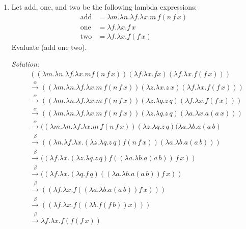 \documentclass[]{article}
\begin{document}
\begin{enumerate}
\item Let add, one, and two be the following lambda expressions:
\begin{align*}
\text{add} &= \lambda m.\lambda n.\lambda f.\lambda x.m\,f(n\,f\,x) \\
\text{one} &= \lambda f.\lambda x.f\,x \\
\text{two} &= \lambda f.\lambda x.f(f\,x)
\end{align*}
Evaluate (add one two).
\item[\emph{Solution}:]
\begin{align*}
&((\lambda m.\lambda n.\lambda f.\lambda x.m f(n\,f\,x))(\lambda f.\lambda x.f x)(\lambda f.\lambda x.f(f\,x)))\\
&\overset{\alpha}{\rightarrow}((\lambda m.\lambda n.\lambda f.\lambda x.m\,f(n\,f\,x))(\lambda z.\lambda x.z\,x)(\lambda f.\lambda x.f(f\,x))) \\
&\overset{\alpha}{\rightarrow}((\lambda m.\lambda n.\lambda f.\lambda x.m\,f(n\,f\,x))(\lambda z.\lambda q.z\,q)(\lambda f.\lambda x.f(f\,x))) \\
&\overset{\alpha}{\rightarrow}((\lambda m.\lambda n.\lambda f.\lambda x.m\,f(n\,f\,x))(\lambda z.\lambda q.z\,q)(\lambda a.\lambda x.a(a\,x))) \\
&\overset{\alpha}{\rightarrow}((\lambda m.\lambda n.\lambda f.\lambda x.m\,f(n\,f\,x))(\lambda z.\lambda q.z\,q)(\lambda a.\lambda b.a(a\,b)\\ 
&\overset{\beta}{\rightarrow}((\lambda n.\lambda f.\lambda x.(\lambda z.\lambda q.z\,q)f(n\,f\,x))(\lambda a.\lambda b.a(a\,b))) \\
&\overset{\beta}{\rightarrow}((\lambda f.\lambda x.(\lambda z.\lambda q.z\,q)f((\lambda a.\lambda b.a(a\,b))\,f\,x)) \\
&\overset{\beta}{\rightarrow}((\lambda f.\lambda x.(\lambda q.f\,q)((\lambda a.\lambda b.a(a\,b))f\,x)) \\
&\overset{\beta}{\rightarrow}((\lambda f.\lambda x.f((\lambda a.\lambda b.a(a\,b))f\,x))) \\
&\overset{\beta}{\rightarrow}((\lambda f.\lambda x.f((\lambda b.f(f\,b))x))) \\
&\overset{\beta}{\rightarrow}\lambda f.\lambda x.f(f(f\,x))
\end{align*}
\end{enumerate}
\end{document}
